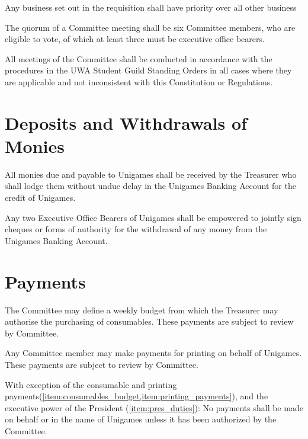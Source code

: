 \documentclass[a4paper]{article}
\begin{document}
\begin{myEnumerate}
\begin{myEnumerate}
\begin{myEnumerate}
                \end{myEnumerate}
            \item Any business set out in the requisition shall have priority over all other business
        \end{myEnumerate}
    \item The quorum of a Committee meeting shall be six Committee members, who are eligible to vote, of which at least three must be executive office bearers.
    \item All meetings of the Committee shall be conducted in accordance with the procedures in the UWA Student Guild Standing Orders in all cases where they are applicable and not inconsistent with this Constitution or Regulations.
\end{myEnumerate}


\section{Deposits and Withdrawals of Monies} \label{sec:monies}
\begin{myEnumerate}
    \item All monies due and payable to Unigames shall be received by the Treasurer who shall lodge them without undue delay in the Unigames Banking Account for the credit of Unigames.
    \item Any two Executive Office Bearers of Unigames shall be empowered to jointly sign cheques or forms of authority for the withdrawal of any money from the Unigames Banking Account.
\end{myEnumerate}


\section{Payments} \label{sec:payments}
\begin{myEnumerate}
    \item \label{item:consumables_budget}The Committee may define a weekly budget from which the Treasurer may authorise the purchasing of consumables. These payments are subject to review by Committee.
    \item \label{item:printing_payments} Any Committee member may make payments for printing on behalf of Unigames. These payments are subject to review by Committee.
    \item With exception of the consumable and printing payments(\cref{item:consumables_budget,item:printing_payments}), and the executive power of the President (\cref{item:pres_duties}): No payments shall be made on behalf or in the name of Unigames unless it has been authorized by the Committee.
\end{myEnumerate}
\end{document}
